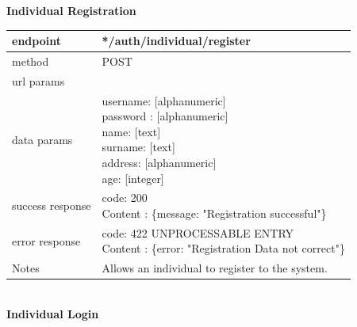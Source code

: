 \begin{legal}
\begin{itemize}
				\textbf{Individual Registration} \\
			
					\begin{tabularx}{\linewidth}{| l | l |}
						\hline
						endpoint & */auth/individual/register \\
						\hline
						method & POST \\
						\hline
						url params & \\
						\hline
						data params &
						\parbox{0.7\textwidth}{
							\bigskip
							username: [alphanumeric]\\
							password : [alphanumeric]\\
							name: [text]\\
							surname: [text]\\
							address: [alphanumeric]\\
							age: [integer]
							\bigskip
						} \\
						\hline
						success response &
						\parbox{0.7\textwidth}{
							\bigskip
							code: 200\\
							Content : \{message: "Registration successful"\}
							\bigskip
						} \\
						\hline
						error response &
						\parbox{0.7\textwidth}{
							\bigskip
							code: 422 UNPROCESSABLE ENTRY \\
							Content : \{error: "Registration Data not correct"\}
							\bigskip
						} \\
						\hline
						Notes & 
						\parbox{0.7\textwidth}{
							\bigskip Allows an individual to register to the system.
						\bigskip}  \\
						\hline
					\end{tabularx}\\
					
					\textbf{Individual Login}\\


\end{itemize}
\end{legal}
